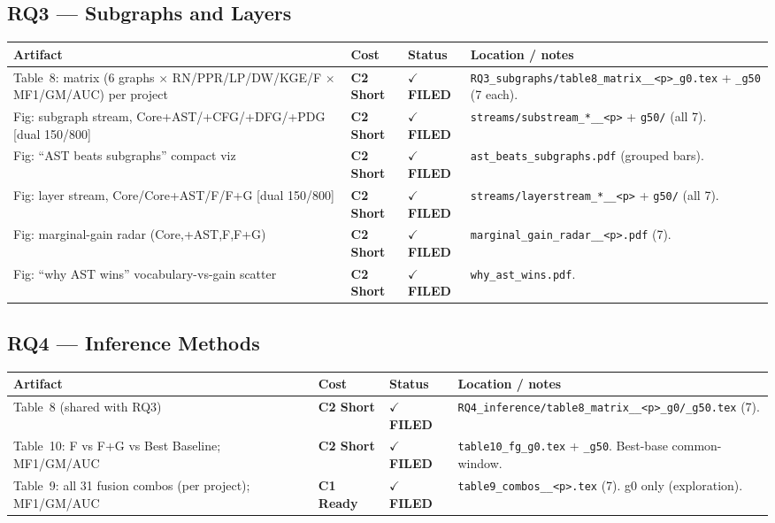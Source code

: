 \documentclass[10pt]{article}
\providecommand{\code}[1]{\texttt{\small #1}}
\newcommand{\Cone}{\textcolor{green!50!black}{\textbf{C1 Ready}}}
\newcommand{\Ctwo}{\textcolor{blue!65!black}{\textbf{C2 Short}}}
\newcommand{\dual}{\textcolor{purple!70!black}{[dual 150/800]}}
\newcommand{\DONE}{\textcolor{green!45!black}{\textbf{$\checkmark$ FILED}}}
\begin{document}
\subsection*{RQ3 --- Subgraphs and Layers}
\begin{longtable}{p{7.0cm}p{1.4cm}p{1.6cm}p{5.4cm}}
\toprule
Artifact & Cost & Status & Location / notes \\ \midrule\endhead
Table~8: matrix (6 graphs $\times$ RN/PPR/LP/DW/KGE/F $\times$ MF1/GM/AUC) per project & \Ctwo & \DONE & \code{RQ3\_subgraphs/table8\_matrix\_\_<p>\_g0.tex} + \code{\_g50} (7 each). \\
Fig: subgraph stream, Core+AST/+CFG/+DFG/+PDG \dual & \Ctwo & \DONE & \code{streams/substream\_*\_\_<p>} + \code{g50/} (all 7). \\
Fig: ``AST beats subgraphs'' compact viz & \Ctwo & \DONE & \code{ast\_beats\_subgraphs.pdf} (grouped bars). \\
Fig: layer stream, Core/Core+AST/F/F+G \dual & \Ctwo & \DONE & \code{streams/layerstream\_*\_\_<p>} + \code{g50/} (all 7). \\
Fig: marginal-gain radar (Core,+AST,F,F+G) & \Ctwo & \DONE & \code{marginal\_gain\_radar\_\_<p>.pdf} (7). \\
Fig: ``why AST wins'' vocabulary-vs-gain scatter & \Ctwo & \DONE & \code{why\_ast\_wins.pdf}. \\
\bottomrule
\end{longtable}

\subsection*{RQ4 --- Inference Methods}
\begin{longtable}{p{7.0cm}p{1.4cm}p{1.6cm}p{5.4cm}}
\toprule
Artifact & Cost & Status & Location / notes \\ \midrule\endhead
Table~8 (shared with RQ3) & \Ctwo & \DONE & \code{RQ4\_inference/table8\_matrix\_\_<p>\_g0/\_g50.tex} (7). \\
Table~10: F vs F+G vs Best Baseline; MF1/GM/AUC & \Ctwo & \DONE & \code{table10\_fg\_g0.tex} + \code{\_g50}. Best-base common-window. \\
Table~9: all 31 fusion combos (per project); MF1/GM/AUC & \Cone & \DONE & \code{table9\_combos\_\_<p>.tex} (7). g0 only (exploration). \\
\bottomrule
\end{longtable}

\end{document}
